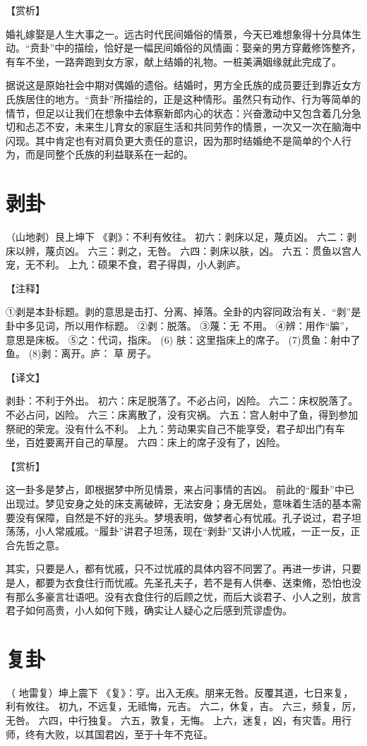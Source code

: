 \documentclass[12pt,UTF8]{ctexbook}
\begin{document}
【赏析】

婚礼嫁娶是人生大事之一。远古时代民间婚俗的情景，今天已难想象得十分具体生动。“贲卦”中的描绘，恰好是一幅民间婚俗的风情画：娶亲的男方穿戴修饰整齐，有车不坐，一路奔跑到女方家，献上结婚的礼物。一桩美满姻缘就此完成了。

据说这是原始社会中期对偶婚的遗俗。结婚时，男方全氏族的成员要迁到靠近女方氏族居住的地方。“贲卦”所描绘的，正是这种情形。虽然只有动作、行为等简单的情节，但足以让我们在想象中去体察新郎内心的状态：兴奋激动中又包含着几分急切和忐忑不安，未来生儿育女的家庭生活和共同劳作的情景，一次又一次在脑海中闪现。其中肯定也有对肩负更大责任的意识，因为那时结婚绝不是简单的个人行为，而是同整个氏族的利益联系在一起的。


\chapter{剥卦}
（山地剥）艮上坤下
《剥》：不利有攸往。
初六：剥床以足，蔑贞凶。
六二：剥床以辨，蔑贞凶。
六三：剥之，无咎。
六四：剥床以肤，凶。
六五：贯鱼以宫人宠，无不利。
上九：硕果不食，君子得舆，小人剥庐。

【注释】

①剥是本卦标题。剥的意思是击打、分离、掉落。全卦的内容同政治有关．“剥”是卦中多见词，所以用作标题。
②剥：脱落。
③蔑：无 不用。
④辨：用作“牑”，意思是床板。
⑤之：代词，指床。
(6) 肤：这里指床上的席子。
(7)贯鱼：射中了鱼。
(8)剥：离开。庐： 草 房子。

【译文】

剥卦：不利于外出。
初六：床足脱落了。不必占问，凶险。
六二：床权脱落了。不必占问，凶险。
六三：床离散了，没有灾祸。
六五：宫人射中了鱼，得到参加祭祀的荣宠。没有什么不利。
上九：劳动果实自己不能享受，君子却出门有车坐，百姓要离开自己的草屋。
六四：床上的席子没有了，凶险。

【赏析】

这一卦多是梦占，即根据梦中所见情景，来占问事情的吉凶。 前此的“履卦”中已出现过。梦见安身之处的床支离破碎，无法安身；身无居处，意味着生活的基本需要没有保障，自然是不好的兆头。梦境表明，做梦者心有忧戚。孔子说过，君子坦荡荡，小人常戚戚。“履卦”讲君子坦荡，现在“剥卦”又讲小人忧戚，一正一反，正合先哲之意。

其实，只要是人，都有忧戚，只不过忧戚的具体内容不同罢了。再进一步讲，只要是人，都要为衣食住行而忧戚。先圣孔夫子，若不是有人供奉、送束脩，恐怕也没有那么多豪言壮语吧。没有衣食住行的后顾之忧，而后大谈君子、小人之别，放言君子如何高贵，小人如何下贱，确实让人疑心之后感到荒谬虚伪。
\chapter{复卦}
（ 地雷复）坤上震下
《复》：亨。出入无疾。朋来无咎。反覆其道，七日来复，利有攸往。
初九，不远复，无祗悔，元吉。
六二，休复，吉。
六三，频复，厉，无咎。
六四，中行独复。
六五，敦复，无悔。
上六，迷复，凶，有灾眚。用行师，终有大败，以其国君凶，至于十年不克征。
\end{document}
